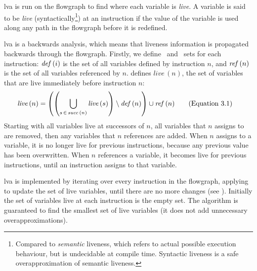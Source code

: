 \documentclass[00-main.tex]{subfiles}
\begin{document}

\Gls{lva} is run on the flowgraph to find where each variable is \emph{live}.
A variable is said to be \emph{live} (syntactically\footnote{Compared to \emph{semantic} liveness, which refers to actual possible execution behaviour, but is undecidable at compile time. Syntactic liveness is a safe overapproximation of semantic liveness.}) at an instruction if the value of the variable is used along any path in the flowgraph before it is redefined.

\Gls{lva} is a backwards analysis, which means that liveness information is propagated backwards through the flowgraph.
Firstly, we define \lvadef\ and \lvaref\ sets for each instruction: $\mathit{def}\,(i)$ is the set of all variables defined by instruction $n$, and $\mathit{ref}\,(n)$ is the set of all variables referenced by $n$.
 defines $\mathit{live}\,(n)$, the set of variables that are live immediately before instruction $n$:
\begin{align}\label{eq:live vars}
  \mathit{live}\,(n) &= \left( \left( \bigcup_{s \,\in\, \mathit{succ}\,(n)} \mathit{live}\,(s) \right) \setminus \mathit{def}\,(n) \right) \cup \mathit{ref}\,(n)
  \tag{Equation~3.1}
\end{align}
Starting with all variables live at successors of $n$, all variables that $n$ assigns to are removed, then any variables that $n$ references are added.
When $n$ assigns to a variable, it is no longer live for previous instructions, because any previous value has been overwritten.
When $n$ references a variable, it becomes live for previous instructions, until an instruction assigns to that variable.

\gls{lva} is implemented by iterating over every instruction in the flowgraph, applying  to update the set of live variables, until there are no more changes (see ).
Initially the set of variables live at each instruction is the empty set.
The algorithm is guaranteed to find the smallest set of live variables (it does not add unnecessary overapproximations).
\end{document}
